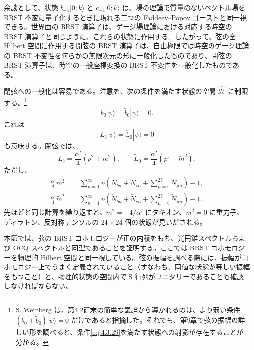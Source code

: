 余談として、状態 $b_{-1}|0;k\rangle$ と $c_{-1}|0;k\rangle$ は、場の理論で質量のないベクトル場を BRST 不変に量子化するときに現れる二つの Faddeev--Popov ゴーストと同一視できる。世界面の BRST 演算子は、ゲージ場理論における対応する時空の BRST 演算子と同じように、これらの状態に作用する。したがって、弦の全 Hilbert 空間に作用する開弦の BRST 演算子は、自由極限では時空のゲージ理論の BRST 不変性を何らかの無限次元の形に一般化したものであり、閉弦の BRST 演算子は、時空の一般座標変換の BRST 不変性を一般化したものである。

閉弦への一般化は容易である。注意を、次の条件を満たす状態の空間 $\widehat{\mathcal H}$ に制限する。\footnote[1]{S. Weinberg は、第4.2節末の簡単な議論から導かれるのは、より弱い条件 $(b_0+\widetilde b_0)|\psi\rangle=0$ だけであると指摘した。それでも、第9章で弦の振幅の詳しい形を調べると、条件\eqref{eq:4.3.29}を満たす状態への射影が存在することが分かる。}
\begin{equation}
b_0|\psi\rangle=\widetilde b_0|\psi\rangle=0.
\tag{4.3.29}\label{eq:4.3.29}
\end{equation}
これは
\begin{equation}
L_0|\psi\rangle=\widetilde L_0|\psi\rangle=0
\tag{4.3.30}\label{eq:4.3.30}
\end{equation}
も意味する。閉弦では、
\begin{equation}
L_0=\frac{\alpha'}4(p^2+m^2),\qquad
\widetilde L_0=\frac{\alpha'}4(p^2+\widetilde m^2),
\tag{4.3.31}\label{eq:4.3.31}
\end{equation}
ただし、
\begin{align}
\frac{\alpha'}4m^2
&=\sum_{n=1}^{\infty}n
\left(N_{bn}+N_{cn}+\sum_{\mu=0}^{25}N_{\mu n}\right)-1,
\tag{4.3.32a}\label{eq:4.3.32a}\\
\frac{\alpha'}4\widetilde m^2
&=\sum_{n=1}^{\infty}n
\left(\widetilde N_{bn}+\widetilde N_{cn}
+\sum_{\mu=0}^{25}\widetilde N_{\mu n}\right)-1.
\tag{4.3.32b}\label{eq:4.3.32b}
\end{align}
先ほどと同じ計算を繰り返すと、$m^2=-4/\alpha'$ にタキオン、$m^2=0$ に重力子、ディラトン、反対称テンソルの $24\times24$ 個の状態が見いだされる。

\label{sec:4.4}

本節では、弦の BRST コホモロジーが正の内積をもち、光円錐スペクトルおよび OCQ スペクトルと同型であることを証明する。ここでは BRST コホモロジーを物理的 Hilbert 空間と同一視している。弦の振幅を調べる際には、振幅がコホモロジー上でうまく定義されていること（すなわち、同値な状態が等しい振幅をもつこと）と、物理的状態の空間内で S 行列がユニタリーであることも確認しなければならない。

